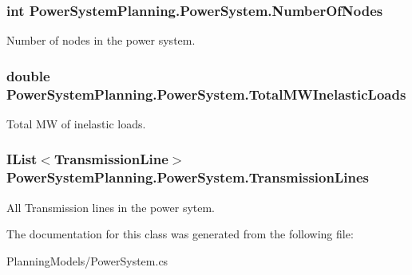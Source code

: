 \subsubsection[{\texorpdfstring{Number\+Of\+Nodes}{NumberOfNodes}}]{\setlength{\rightskip}{0pt plus 5cm}int Power\+System\+Planning.\+Power\+System.\+Number\+Of\+Nodes\hspace{0.3cm}{\ttfamily [get]}}\hypertarget{class_power_system_planning_1_1_power_system_a3d7abefe87bb1621c5d61644b83ae3d5}{}\label{class_power_system_planning_1_1_power_system_a3d7abefe87bb1621c5d61644b83ae3d5}


Number of nodes in the power system. 

\subsubsection[{\texorpdfstring{Total\+M\+W\+Inelastic\+Loads}{TotalMWInelasticLoads}}]{\setlength{\rightskip}{0pt plus 5cm}double Power\+System\+Planning.\+Power\+System.\+Total\+M\+W\+Inelastic\+Loads\hspace{0.3cm}{\ttfamily [get]}}\hypertarget{class_power_system_planning_1_1_power_system_ade5099d2eb198a61bf794e14ce4b3018}{}\label{class_power_system_planning_1_1_power_system_ade5099d2eb198a61bf794e14ce4b3018}


Total MW of inelastic loads. 

\subsubsection[{\texorpdfstring{Transmission\+Lines}{TransmissionLines}}]{\setlength{\rightskip}{0pt plus 5cm}I\+List$<${\bf Transmission\+Line}$>$ Power\+System\+Planning.\+Power\+System.\+Transmission\+Lines\hspace{0.3cm}{\ttfamily [get]}}\hypertarget{class_power_system_planning_1_1_power_system_a8b2c36218174e515b9ab0ef34531435f}{}\label{class_power_system_planning_1_1_power_system_a8b2c36218174e515b9ab0ef34531435f}


All Transmission lines in the power sytem. 



The documentation for this class was generated from the following file\+:\begin{DoxyCompactItemize}
\item 
Planning\+Models/Power\+System.\+cs\end{DoxyCompactItemize}
